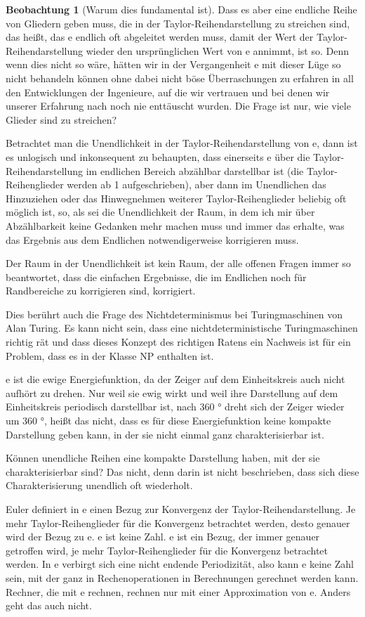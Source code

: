 ﻿\documentclass[a4paper,12pt]{report}
\theoremstyle{definition}
\newtheorem{beobachtung}{Beobachtung}
\begin{document}
\begin{beobachtung}[Warum dies fundamental ist]
		Dass es aber eine endliche Reihe von Gliedern geben muss, die in der Taylor-Reihendar\-stellung zu streichen sind, das heißt, das e endlich oft abgeleitet werden muss, damit der Wert der Taylor-Reihen\-darstellung wieder den ursprünglichen Wert von e annimmt, ist so. Denn wenn dies nicht so wäre, hätten wir in der Vergangenheit e mit dieser Lüge so nicht behandeln können ohne dabei nicht böse Überraschungen zu erfahren in all den Entwicklungen der Ingenieure, auf die wir vertrauen und bei denen wir unserer Erfahrung nach noch nie enttäuscht wurden. Die Frage ist nur, wie viele Glieder sind zu streichen?
		
		Betrachtet man die Unendlichkeit in der Taylor-Reihendarstellung von e, dann ist es unlogisch und inkonsequent zu behaupten, dass einerseits e über die Taylor-Reihendarstellung im endlichen Bereich abzählbar darstellbar ist (die Taylor-Reihenglieder werden ab 1 aufgeschrieben), aber dann im Unendlichen das Hinzuziehen oder das Hinwegnehmen weiterer Taylor-Reihenglieder beliebig oft möglich ist, so, als sei die Unendlichkeit der Raum, in dem ich mir über Abzählbarkeit keine Gedanken mehr machen muss und immer das erhalte, was das Ergebnis aus dem Endlichen notwendigerweise korrigieren muss. 
		
		Der Raum in der Unendlichkeit ist kein Raum, der alle offenen Fragen immer so beantwortet, dass die einfachen Ergebnisse, die im Endlichen noch für Randbereiche zu korrigieren sind, korrigiert.
		
		Dies berührt auch die Frage des Nichtdeterminismus bei Turingmaschinen von Alan Turing. Es kann nicht sein, dass eine nichtdeterministische Turingmaschinen richtig rät und dass dieses Konzept des richtigen Ratens ein Nachweis ist für ein Problem, dass es in der Klasse NP enthalten ist.
		
		e ist die ewige Energiefunktion, da der Zeiger auf dem Einheitskreis auch nicht aufhört zu drehen. Nur weil sie ewig wirkt und weil ihre Darstellung auf dem Einheitskreis periodisch darstellbar ist, nach 360 ° dreht sich der Zeiger wieder um 360 °, heißt das nicht, dass es für diese Energiefunktion keine kompakte Darstellung geben kann, in der sie nicht einmal ganz charakterisierbar ist.
		
		Können unendliche Reihen eine kompakte Darstellung haben, mit der sie charakterisierbar sind? Das nicht, denn darin ist nicht beschrieben, dass sich diese Charakterisierung unendlich oft wiederholt.
		
		Euler definiert in e einen Bezug zur Konvergenz der Taylor-Reihendarstellung. Je mehr Taylor-Reihenglieder für die Konvergenz betrachtet werden, desto genauer wird der Bezug zu e. e ist keine Zahl. e ist ein Bezug, der immer genauer getroffen wird, je mehr Taylor-Reihenglieder für die Konvergenz betrachtet werden. In e verbirgt sich eine nicht endende Periodizität, also kann e keine Zahl sein, mit der ganz in Rechenoperationen in Berechnungen gerechnet werden kann. Rechner, die mit e rechnen, rechnen nur mit einer Approximation von e. Anders geht das auch nicht.
		

\end{beobachtung}
\end{document}
